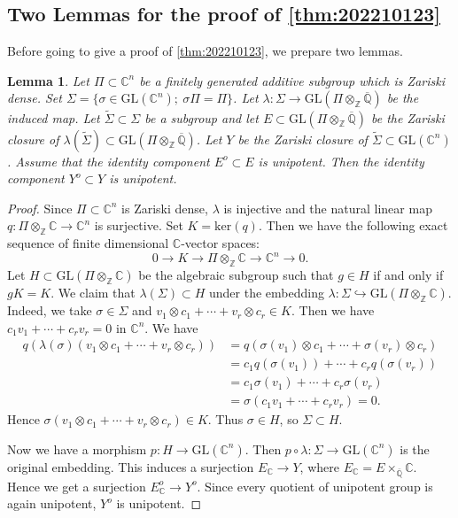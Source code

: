 \documentclass[11pt,english]{smfart}
\theoremstyle{plain}
\newtheorem{lem}[thm]{Lemma}
\theoremstyle{definition}
\theoremstyle{remark}
\numberwithin{equation}{subsection}
\theoremstyle{plain}
\begin{document}
\subsection{Two Lemmas for the proof of \cref{thm:202210123}}\label{s3}

Before going to give a proof of \cref{thm:202210123}, we prepare two  lemmas. 

\begin{lem}\label{claim:20221014}
Let $\Pi\subset \mathbb C^n$ be a finitely generated additive subgroup which is Zariski dense.
Set $\Sigma=\{ \sigma\in\mathrm{GL}(\mathbb C^n);\ \sigma\Pi= \Pi\}$.
Let $\lambda:\Sigma\to \mathrm{GL}(\Pi\otimes_{\mathbb Z}\overline{\mathbb Q})$ be the induced map.
Let $\widetilde{\Sigma}\subset \Sigma$ be a subgroup and let $E\subset \mathrm{GL}(\Pi\otimes_{\mathbb Z}\overline{\mathbb Q})$ be the Zariski closure of $\lambda(\widetilde{\Sigma})\subset \mathrm{GL}(\Pi\otimes_{\mathbb Z}\overline{\mathbb Q})$.
Let $Y$ be the Zariski closure of $\widetilde{\Sigma}\subset \mathrm{GL}(\mathbb C^n)$.
Assume that the identity component $E^o\subset E$ is unipotent.
Then the identity component $Y^o\subset Y$ is unipotent.  
\end{lem}

\begin{proof}
Since $\Pi\subset \mathbb C^n$ is Zariski dense, $\lambda$ is injective and the natural linear map $q:\Pi\otimes_{\mathbb Z}\mathbb C\to \mathbb C^n$ is surjective.
Set $K=\mathrm{ker}(q)$.
Then we have the following exact sequence of finite dimensional $\mathbb C$-vector spaces:
$$
0\to K\to \Pi\otimes_{\mathbb Z}\mathbb C\to \mathbb C^n\to 0.
$$
Let $H\subset \mathrm{GL}(\Pi\otimes_{\mathbb Z}\mathbb C)$ be the algebraic subgroup such that $g\in H$ if and only if $gK=K$.
We claim that $\lambda(\Sigma)\subset H$ under the embedding $\lambda:\Sigma\hookrightarrow \mathrm{GL}(\Pi\otimes_{\mathbb Z}\mathbb C)$.
Indeed, we take $\sigma\in \Sigma$ and $v_1\otimes c_1+\cdots+v_r\otimes c_r\in K$.
Then we have $c_1v_1+\cdots +c_rv_r=0$ in $\mathbb C^n$.
We have
\begin{equation*}
\begin{split}
q(\lambda(\sigma)(v_1\otimes c_1+\cdots+v_r\otimes c_r))&=q(\sigma(v_1)\otimes c_1+\cdots+\sigma(v_r)\otimes c_r)\\
&=c_1q(\sigma(v_1))+\cdots+c_rq(\sigma(v_r))
\\
&=c_1\sigma(v_1)+\cdots+c_r\sigma(v_r)
\\
&=\sigma(c_1v_1+\cdots+c_rv_r)=0.
\end{split}
\end{equation*}
Hence $\sigma(v_1\otimes c_1+\cdots+v_r\otimes c_r)\in K$.
Thus $\sigma\in H$, so $\Sigma\subset H$.

Now we have a morphism $p:H\to \mathrm{GL}(\mathbb C^n)$.
Then $p\circ\lambda:\Sigma\to \mathrm{GL}(\mathbb C^n)$ is the original embedding.
This induces a surjection $E_{\mathbb C}\to Y$, where $E_{\mathbb C}=E\times_{\bar{\mathbb Q}}\mathbb C$.
Hence we get a surjection $E^o_{\mathbb C}\to Y^o$.
Since every quotient of unipotent group is again unipotent, 
 $Y^o$ is unipotent. 
\end{proof}
\end{document}
